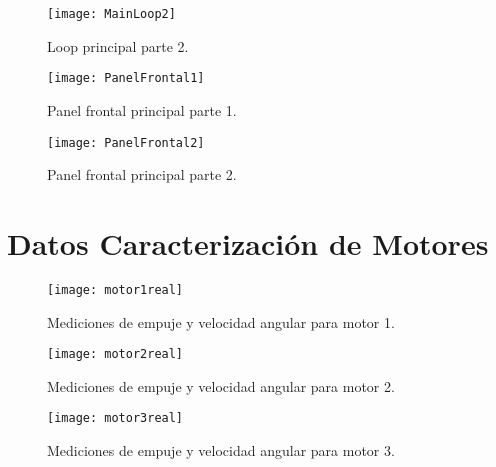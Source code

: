 \documentclass[\main/main.tex]{subfiles}
\begin{document}
\begin{landscape}
\begin{figure}
\begin{centering}
\texttt{[image: MainLoop2]}
\par\end{centering}
\caption{Loop principal parte 2. }
\end{figure}

\begin{figure}
\begin{centering}
\texttt{[image: PanelFrontal1]}
\par\end{centering}
\caption{Panel frontal principal parte 1.}
\end{figure}

\begin{figure}
\begin{centering}
\texttt{[image: PanelFrontal2]}
\par\end{centering}
\caption{Panel frontal principal parte 2.}
\end{figure}

\end{landscape}

\section*{Datos Caracterización de Motores}

\begin{figure}
\begin{centering}
\texttt{[image: motor1real]}
\par\end{centering}
\caption{Mediciones de empuje y velocidad angular para motor 1.}
\end{figure}

\begin{figure}
\begin{centering}
\texttt{[image: motor2real]}
\par\end{centering}
\caption{Mediciones de empuje y velocidad angular para motor 2.}
\end{figure}

\begin{figure}
\begin{centering}
\texttt{[image: motor3real]}
\par\end{centering}
\caption{Mediciones de empuje y velocidad angular para motor 3.}
\end{figure}
\end{document}
